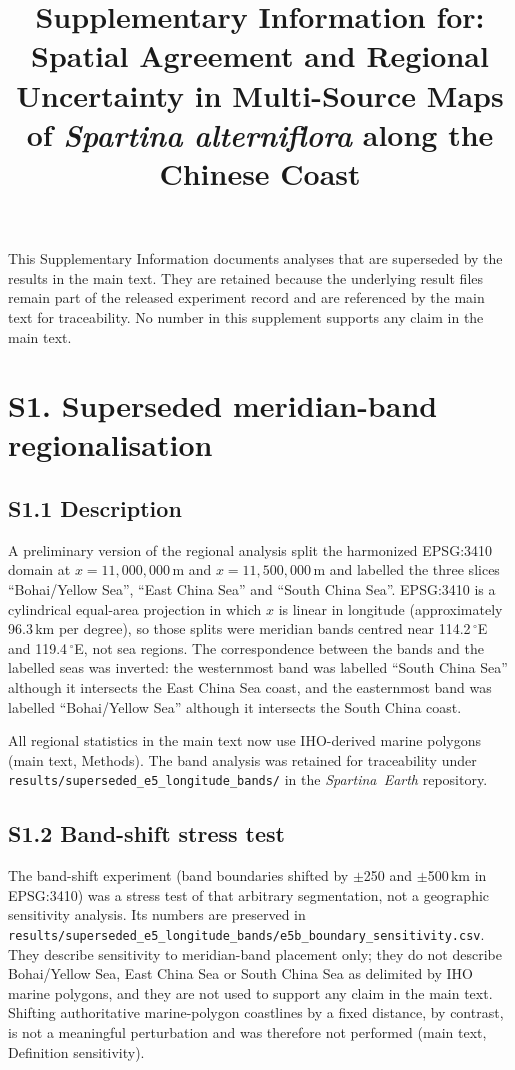 \documentclass[11pt]{article}
\title{Supplementary Information for:\\
Spatial Agreement and Regional Uncertainty in Multi-Source Maps of
\textit{Spartina alterniflora} along the Chinese Coast}
\author{}
\date{}
\begin{document}
\maketitle

This Supplementary Information documents analyses that are superseded by the
results in the main text. They are retained because the underlying result
files remain part of the released experiment record and are referenced by the
main text for traceability. No number in this supplement supports any claim
in the main text.

\section*{S1. Superseded meridian-band regionalisation}
\label{sec:s1-bands}

\subsection*{S1.1 Description}

A preliminary version of the regional analysis split the harmonized
EPSG:3410 domain at $x = 11{,}000{,}000$\,m and $x = 11{,}500{,}000$\,m and
labelled the three slices ``Bohai/Yellow Sea'', ``East China Sea'' and
``South China Sea''. EPSG:3410 is a cylindrical equal-area projection in
which $x$ is linear in longitude (approximately 96.3\,km per degree), so
those splits were meridian bands centred near 114.2\,$^\circ$E and
119.4\,$^\circ$E, not sea regions. The correspondence between the bands and
the labelled seas was inverted: the westernmost band was labelled
``South China Sea'' although it intersects the East China Sea coast, and
the easternmost band was labelled ``Bohai/Yellow Sea'' although it
intersects the South China coast.

All regional statistics in the main text now use IHO-derived marine
polygons (main text, Methods). The band analysis was retained for
traceability under \texttt{results/superseded\_e5\_longitude\_bands/}
in the \textit{Spartina~Earth} repository.

\subsection*{S1.2 Band-shift stress test}

The band-shift experiment (band boundaries shifted by $\pm$250 and
$\pm$500\,km in EPSG:3410) was a stress test of that arbitrary
segmentation, not a geographic sensitivity analysis. Its numbers are
preserved in
\texttt{results/superseded\_e5\_longitude\_bands/e5b\_boundary\_sensitivity.csv}.
They describe sensitivity to meridian-band placement only; they do not
describe Bohai/Yellow Sea, East China Sea or South China Sea as delimited
by IHO marine polygons, and they are not used to support any claim in the
main text. Shifting authoritative marine-polygon coastlines by a fixed
distance, by contrast, is not a meaningful perturbation and was therefore
not performed (main text, Definition sensitivity).
\end{document}
